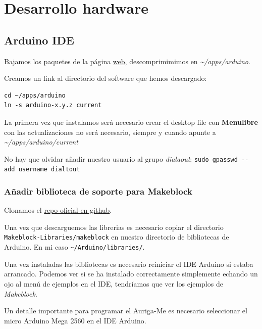 \documentclass[12pt,spanish,]{scrartcl}
\begin{document}
\hypertarget{desarrollo-hardware}{%
\section{Desarrollo hardware}\label{desarrollo-hardware}}

\hypertarget{arduino-ide}{%
\subsection{Arduino IDE}\label{arduino-ide}}

Bajamos los paquetes de la página \href{https://www.arduino.cc}{web},
descomprimimimos en \emph{\textasciitilde{}/apps/arduino}.

Creamos un link al directorio del software que hemos descargado:

\begin{verbatim}
cd ~/apps/arduino
ln -s arduino-x.y.z current
\end{verbatim}

La primera vez que instalamos será necesario crear el desktop file con
\textbf{Menulibre} con las actualizaciones no será necesario, siempre y
cuando apunte a \emph{\textasciitilde{}/apps/arduino/current}

No hay que olvidar añadir nuestro usuario al grupo \emph{dialaout}:
\texttt{sudo\ gpasswd\ -\/-add\ username\ dialtout}

\hypertarget{auxf1adir-biblioteca-de-soporte-para-makeblock}{%
\subsubsection{Añadir biblioteca de soporte para
Makeblock}\label{auxf1adir-biblioteca-de-soporte-para-makeblock}}

Clonamos el
\href{https://github.com/Makeblock-official/Makeblock-Libraries}{repo
oficial en github}.

Una vez que descarguemos las librerias es necesario copiar el directorio
\texttt{Makeblock-Libraries/makeblock} en nuestro directorio de
bibliotecas de Arduino. En mi caso
\texttt{\textasciitilde{}/Arduino/libraries/}.

Una vez instaladas las bibliotecas es necesario reiniciar el IDE Arduino
si estaba arrancado. Podemos ver si se ha instalado correctamente
simplemente echando un ojo al menú de ejemplos en el IDE, tendríamos que
ver los ejemplos de \emph{Makeblock}.

Un detalle importante para programar el Auriga-Me es necesario
seleccionar el micro Arduino Mega 2560 en el IDE Arduino.
\end{document}
